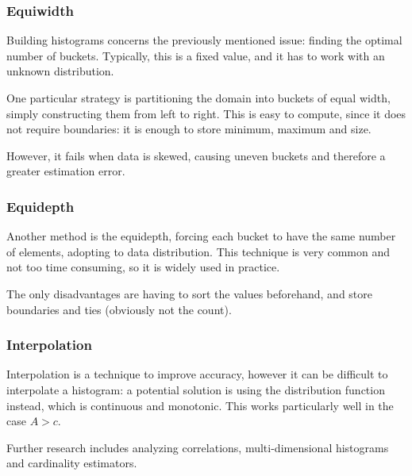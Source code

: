 \subsubsection{Equiwidth}
Building histograms concerns the previously mentioned issue: finding the optimal number of buckets. Typically, this is a fixed value, and it has to work with an unknown distribution.

One particular strategy is partitioning the domain into buckets of equal width, simply constructing them from left to right. This is easy to compute, since it does not require boundaries: it is enough to store minimum, maximum and size. 

However, it fails when data is skewed, causing uneven buckets and therefore a greater estimation error. 

\subsubsection{Equidepth}
Another method is the equidepth, forcing each bucket to have the same number of elements, adopting to data distribution. This technique is very common and not too time consuming, so it is widely used in practice.

The only disadvantages are having to sort the values beforehand, and store boundaries and ties (obviously not the count).

\subsubsection{Interpolation}
Interpolation is a technique to improve accuracy, however it can be difficult to interpolate a histogram: a potential solution is using the distribution function instead, which is continuous and monotonic. This works particularly well in the case $A > c$.

Further research includes analyzing correlations, multi-dimensional histograms and cardinality estimators.